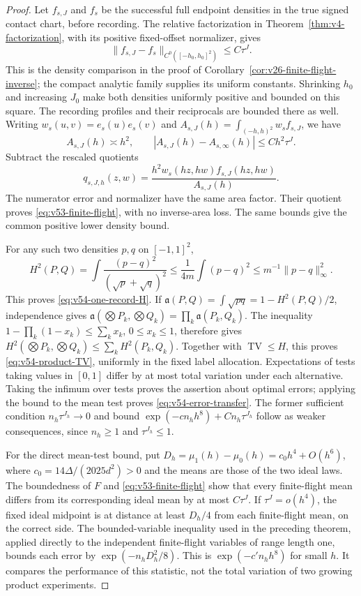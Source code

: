 \begin{proof}
Let $f_{s,J}$ and $f_s$ be the successful full endpoint densities in the
true signed contact chart, before recording.  The relative factorization
in Theorem~\ref{thm:v4-factorization}, with its positive fixed-offset
normalizer, gives
\[
 \|f_{s,J}-f_s\|_{C^0([-h_0,h_0]^2)}\le C\tau^J.
\]
This is the density comparison in the proof of
Corollary~\ref{cor:v26-finite-flight-inverse}; the compact analytic family
supplies its uniform constants.  Shrinking $h_0$ and increasing $J_0$
make both densities uniformly positive and bounded on this square.
The recording profiles and their reciprocals are bounded there as well.
Writing $w_s(u,v)=e_s(u)e_s(v)$ and
$A_{s,J}(h)=\int_{(-h,h)^2}w_sf_{s,J}$, we have
\[
 A_{s,J}(h)\asymp h^2,\qquad
 |A_{s,J}(h)-A_{s,\infty}(h)|\le Ch^2\tau^J.
\]
Subtract the rescaled quotients
\[
 q_{s,J,h}(z,w)=
 \frac{h^2w_s(hz,hw)f_{s,J}(hz,hw)}{A_{s,J}(h)}.
\]
The numerator error and normalizer have the same area factor.  Their
quotient proves \eqref{eq:v53-finite-flight}, with no inverse-area loss.
The same bounds give the common positive lower density bound.

For any such two densities $p,q$ on $[-1,1]^2$,
\[
 H^2(P,Q)=\int\frac{(p-q)^2}{(\sqrt p+\sqrt q)^2}
       \le\frac{1}{4m}\int(p-q)^2
       \le m^{-1}\|p-q\|_\infty^2.
\]
This proves \eqref{eq:v54-one-record-H}.  If
$\mathfrak a(P,Q)=\int\sqrt{pq}=1-H^2(P,Q)/2$, independence gives
$\mathfrak a(\bigotimes P_k,\bigotimes Q_k)=\prod_k\mathfrak a(P_k,Q_k)$.
The inequality $1-\prod_k(1-x_k)\le\sum_kx_k$, $0\le x_k\le1$,
therefore gives
$H^2(\bigotimes P_k,\bigotimes Q_k)\le\sum_k H^2(P_k,Q_k)$.
Together with $\operatorname{TV}\le H$, this proves
\eqref{eq:v54-product-TV}, uniformly in the fixed label allocation.
Expectations of tests taking values in $[0,1]$ differ by at most total
variation under each alternative.  Taking the infimum over tests proves
the assertion about optimal errors; applying the bound to the mean test
proves \eqref{eq:v54-error-transfer}.  The former sufficient condition
$n_h\tau^{J_h}\to0$ and bound $\exp(-cn_hh^8)+Cn_h\tau^{J_h}$ follow
as weaker consequences, since $n_h\ge1$ and $\tau^{J_h}\le1$.

For the direct mean-test bound, put
$D_h=\mu_1(h)-\mu_0(h)=c_0h^4+O(h^6)$, where
$c_0=14\Delta/(2025d^2)>0$ and the means are those of the two ideal
laws.  The boundedness of $F$ and \eqref{eq:v53-finite-flight} show that
every finite-flight mean differs from its corresponding ideal mean by
at most $C\tau^J$.  If $\tau^J=o(h^4)$, the fixed ideal midpoint is
at distance at least $D_h/4$ from each finite-flight mean, on the correct
side.  The bounded-variable inequality used in the preceding theorem,
applied directly to the independent finite-flight variables of range
length one, bounds each error by $\exp(-n_hD_h^2/8)$.  This is
$\exp(-c'n_hh^8)$ for small $h$.  It compares the performance of this
statistic, not the total variation of two growing product experiments.


\end{proof}
